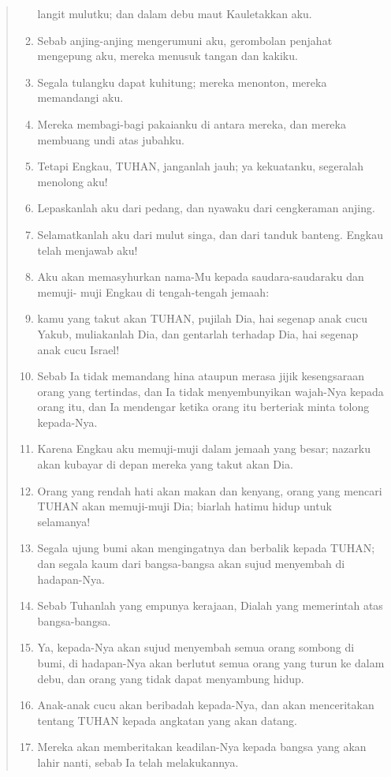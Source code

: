 \begin{quote}
\begin{enumerate}
     langit mulutku; dan dalam debu maut Kauletakkan aku.
     \item Sebab anjing-anjing mengerumuni aku, gerombolan penjahat mengepung
     aku, mereka menusuk tangan dan kakiku.
     \item Segala tulangku dapat kuhitung; mereka menonton, mereka memandangi
     aku.
     \item Mereka membagi-bagi pakaianku di antara mereka, dan mereka
     membuang undi atas jubahku.
     \item Tetapi Engkau, TUHAN, janganlah jauh; ya kekuatanku, segeralah
     menolong aku!
     \item Lepaskanlah aku dari pedang, dan nyawaku dari cengkeraman anjing.
     \item Selamatkanlah aku dari mulut singa, dan dari tanduk banteng.
     Engkau telah menjawab aku!
     \item Aku akan memasyhurkan nama-Mu kepada saudara-saudaraku dan memuji-
     muji Engkau di tengah-tengah jemaah:
     \item kamu yang takut akan TUHAN, pujilah Dia, hai segenap anak cucu
     Yakub, muliakanlah Dia, dan gentarlah terhadap Dia, hai segenap anak
     cucu Israel!
     \item Sebab Ia tidak memandang hina ataupun merasa jijik kesengsaraan
     orang yang tertindas, dan Ia tidak menyembunyikan wajah-Nya kepada
     orang itu, dan Ia mendengar ketika orang itu berteriak minta tolong
     kepada-Nya.
     \item Karena Engkau aku memuji-muji dalam jemaah yang besar; nazarku
     akan kubayar di depan mereka yang takut akan Dia.
     \item Orang yang rendah hati akan makan dan kenyang, orang yang mencari
     TUHAN akan memuji-muji Dia; biarlah hatimu hidup untuk selamanya!
     \item Segala ujung bumi akan mengingatnya dan berbalik kepada TUHAN; dan
     segala kaum dari bangsa-bangsa akan sujud menyembah di hadapan-Nya.
     \item Sebab Tuhanlah yang empunya kerajaan, Dialah yang memerintah atas
     bangsa-bangsa.
     \item Ya, kepada-Nya akan sujud menyembah semua orang sombong di bumi,
     di hadapan-Nya akan berlutut semua orang yang turun ke dalam debu,
     dan orang yang tidak dapat menyambung hidup.
     \item Anak-anak cucu akan beribadah kepada-Nya, dan akan menceritakan
     tentang TUHAN kepada angkatan yang akan datang.
     \item Mereka akan memberitakan keadilan-Nya kepada bangsa yang akan
     lahir nanti, sebab Ia telah melakukannya.
\end{enumerate}
\end{quote}

